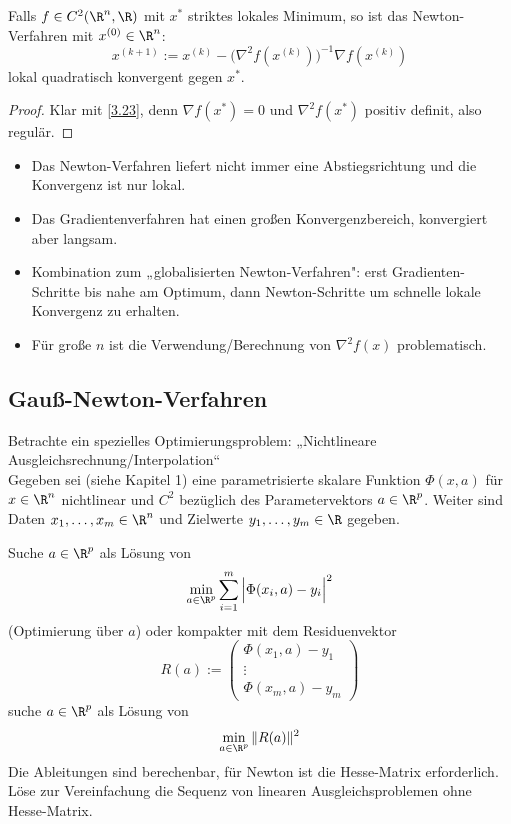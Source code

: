 \documentclass[11pt]{scrbook}
\begin{document}
\begin{kor} \label{4.26}
	Falls $f \in C^2 (\R^n, \R)$ mit $x^*$ striktes lokales Minimum, so ist das Newton-Verfahren mit $x^{(0)} \in \R^n$:
	\[
		x^{(k+1)} := x^{(k)} - \Big( \nabla^2 f(x^{(k)}) \Big)^{-1} \nabla f(x^{(k)})
	\]
	lokal quadratisch konvergent gegen $x^*$.
	\begin{proof}
		Klar mit \ref{3.23}, denn $\nabla f(x^*) = 0$ und $\nabla^2 f(x^*)$ positiv definit, also regulär.
	\end{proof}
	\begin{note}
		\begin{itemize}
			\item
				Das Newton-Verfahren liefert nicht immer eine Abstiegsrichtung und die Konvergenz ist nur lokal.
			\item
				Das Gradientenverfahren hat einen großen Konvergenzbereich, konvergiert aber langsam.
			\item
				Kombination zum „globalisierten Newton-Verfahren": erst Gradienten-Schritte bis nahe am Optimum, dann Newton-Schritte um schnelle lokale Konvergenz zu erhalten.
			\item
				Für große $n$ ist die Verwendung/Berechnung von $\nabla^2 f(x)$  problematisch.
		\end{itemize}
	\end{note}
\end{kor}


\subsection{Gauß-Newton-Verfahren}


Betrachte ein spezielles Optimierungsproblem: „Nichtlineare Ausgleichsrechnung/Interpolation“ \\
Gegeben sei (siehe Kapitel 1) eine parametrisierte skalare Funktion $\Phi(x, a)$  für $x \in \R^n$ nichtlinear und $C^2$ bezüglich des Parametervektors $a \in \R^p$.
Weiter sind Daten $x_1, \dotsc, x_m \in \R^n$ und Zielwerte $y_1, \dotsc, y_m \in \R$ gegeben.

Suche $a \in \R^p$ als Lösung von
\[
	\min_{a \in \R^p} \sum_{i=1}^m \Big| \Phi(x_i,a) - y_i \Big|^2
\]
(Optimierung über $a$)
oder kompakter mit dem Residuenvektor
\[
	R(a) := \begin{pmatrix}
		\Phi(x_1,a) - y_1 \\
		\vdots \\
		\Phi(x_m, a) - y_m
	\end{pmatrix}
\]
suche $a \in \R^p$ als Lösung von
\[
	\min_{a \in \R^p} \|R(a)\|^2
\]
Die Ableitungen sind berechenbar, für Newton ist die Hesse-Matrix erforderlich.
Löse zur Vereinfachung die Sequenz von linearen Ausgleichsproblemen ohne Hesse-Matrix.
\end{document}
